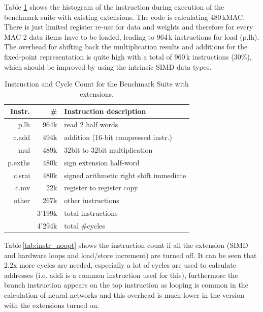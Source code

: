 Table \ref{tab:instr} shows the histogram of the instruction during execution of the benchmark suite with existing extensions. The code is calculating 480\,kMAC. There is just limited register re-use for data and weights and therefore for every MAC 2 data items have to be loaded, leading to  964\,k instructions for load (p.lh). The overhead for shifting back the multiplication results and additions for the fixed-point representation is quite high with a total of 960\,k instructions (30\%), which should be improved by using the intrinsic SIMD data types.

\begin{table}[h]
\centering
\begin{tabular}{|r|r|l|}
\hline
         Instr. & \# & Instruction description   \\ \hline
        p.lh& 964k & read 2 half words \\ \hline
       c.add& 494k & addition (16-bit compressed instr.) \\ \hline
         mul& 489k & 32bit to 32bit multiplication  \\ \hline
     p.exths& 480k & sign extension half-word \\ \hline
      c.srai& 480k & signed arithmetic right shift immediate \\ \hline
        c.mv&  22k & register to register copy \\ \hline
     other&  267k & other instructions \\ \hline\hline
         & 3'199k & total instructions \\ \hline
         & 4'294k & total \#cycles\\ \hline
\end{tabular}
\caption{Instruction and Cycle Count for the Benchmark Suite with extensions.}\label{tab:instr}
\end{table}
Table\,\ref{tab:instr_noopt} shows the instruction count if all the extension (SIMD and hardware loops and load/store increment) are turned off. It can be seen that 2.2x more cycles are needed, especially a lot of cycles are used to calculate addresses (i.e. addi is a common instruction used for this), furthermore the branch instruction appears on the top instruction as looping is common in the calculation of neural networks and this overhead is much lower in the version with the extensions turned on.

